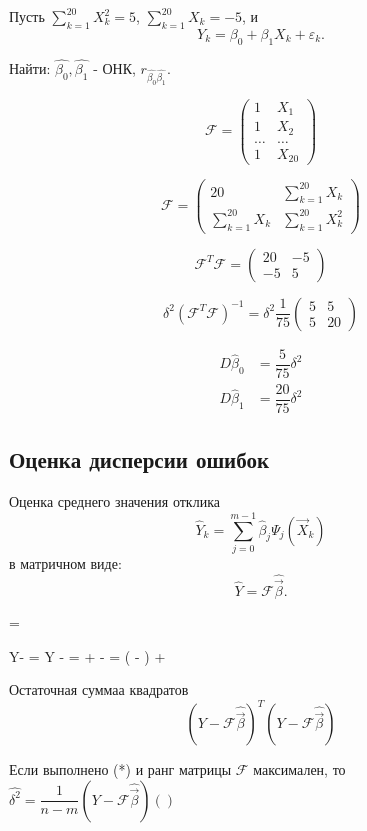 \begin{ex}
  Пусть $\sum_{k=1}^20 X_k^2 = 5$, $\sum_{k=1}^20 X_k= -5$, и
  \[
    Y_k = \beta_0 + \beta_1 X_k + \varepsilon_k.
  \]

  Найти: $\hat{\beta_0}, \hat{\beta_1}$ - ОНК, $r_{\hat{\beta_0} \hat{\beta_1}}$.

  \[
    \mathcal{F} = \begin{pmatrix}
      1 & X_1 \\
      1 & X_2 \\
      \dots & \dots \\
      1 & X_{20}
    \end{pmatrix}
  \]

  \[
    \mathcal{F} = \begin{pmatrix}
      20 & \sum_{k=1}^{20} X_k \\
      \sum_{k=1}^{20} X_k & \sum_{k=1}^{20} X_k^2
    \end{pmatrix}
  \]

  \[
    \mathcal{F}^T \mathcal{F} = \begin{pmatrix}
      20 & -5 \\
      -5 & 5
    \end{pmatrix}
  \]
  
  \[
    \delta^2 (\mathcal{F}^T \mathcal{F})^{-1} = \delta^2 \dfrac{1}{75} \begin{pmatrix}
      5 & 5 \\
      5 & 20
    \end{pmatrix}
  \]

  \begin{align*}
    D \hat{\beta}_0 &= \dfrac{5}{75} \delta^2 \\
    D \hat{\beta}_1 &= \dfrac{20}{75} \delta^2
  \end{align*}
\end{ex}

\subsection{Оценка дисперсии ошибок}

\begin{definition}
  Оценка среднего значения отклика
  \[
    \hat{Y}_k = \sum_{j=0}^{m-1} \hat{\beta}_j \Psi_j(\vec{X}_k)
  \]
  в матричном виде:
  \[
    \hat{Y} = \mathcal{F} \hat{\vec{\beta}}.
  \]

   =  \hat{\vec{\beta}}

  Y- = Y -  \hat{\vec{\beta}}
  =  \vec{\beta} + \varepsilon - \hat{\vec{\beta}}
  =  (\vec{\beta} - \hat{\vec{\beta}}) + \varepsilon

  Остаточная суммаа квадратов
  \[
    (Y - \mathcal{F} \hat{\vec{\beta}})^T (Y-\mathcal{F}\hat{\vec{\beta}})
  \]
\end{definition}

\begin{theorem}
  Если выполнено (*) и ранг матрицы $\mathcal{F}$ максимален, то $\hat{\delta^2} = \dfrac{1}{n-m} (Y-\mathcal{F}\hat{\vec{\beta}})()$
\end{theorem}

